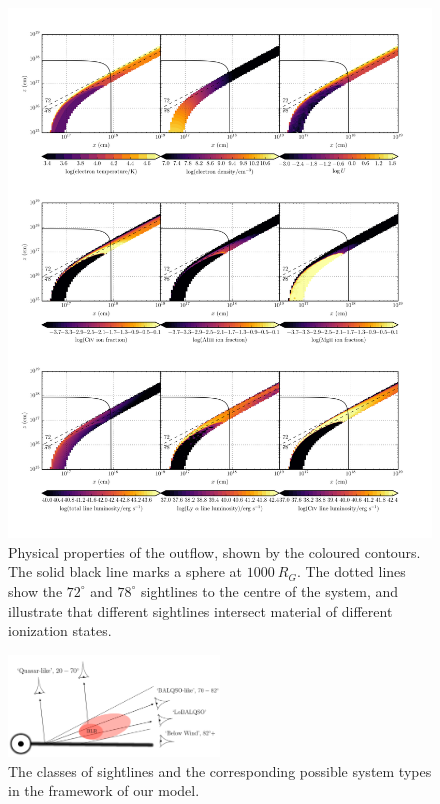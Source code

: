 \documentclass[useAMS,usenatbib]{mn2e_x}
\begin{document}
\begin{figure} %
\centering
\includegraphics[width=1.0\textwidth]{figures/wind.png}
\caption
{
Physical properties of the outflow, shown by the coloured contours.
The solid black line marks a sphere at $1000~R_G$.
The dotted lines show the $72^\circ$ and $78^\circ$ sightlines 
to the centre of the system, and illustrate that different sightlines
intersect material of different ionization states.
}
\label{fig:uvspec}
\end{figure} %

\begin{figure}
\centering
\includegraphics[width=0.5\textwidth]{figures/sightlines.png}
\caption
{
The classes of sightlines and the corresponding possible 
system types in the framework of our model.
}
\label{fig:lobal}
\end{figure}
\end{document}
